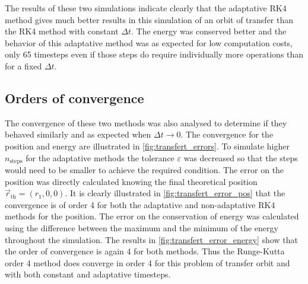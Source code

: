 The results of these two simulations indicate clearly that the adaptative RK4 method gives much better results in this simulation of an orbit of transfer than the RK4 method with constant $\Delta t$. The energy was conserved better and the behavior of this adaptative method was as expected for low computation costs, only 65 timesteps even if those steps do require individually more operations than for a fixed $\Delta t$.

\subsection{Orders of convergence}
The convergence of these two methods was also analysed to determine if they behaved similarly and as expected when $\Delta t \to 0$. The convergence for the position and energy are illustrated in \autoref{fig:transfert_errors}. To simulate higher $n_\mathrm{steps}$ for the adaptative methods the tolerance $\varepsilon$ was decreased so that the steps would need to be smaller to achieve the required condition. The error on the position was directly calculated knowing the final theoretical position $\vec{r}_\mathrm{th} = \left(r_1, 0, 0\right)$. It is clearly illustrated in \autoref{fig:transfert_error_pos} that the convergence is of order 4 for both the adaptative and non-adaptative RK4 methods for the position. The error on the conservation of energy was calculated using the difference between the maximum and the minimum of the energy throughout the simulation. The results in \autoref{fig:transfert_error_energy} show that the order of convergence is again 4 for both methods. Thus the Runge-Kutta order 4 method does converge in order 4 for this problem of transfer orbit and with both constant and adaptative timesteps.

